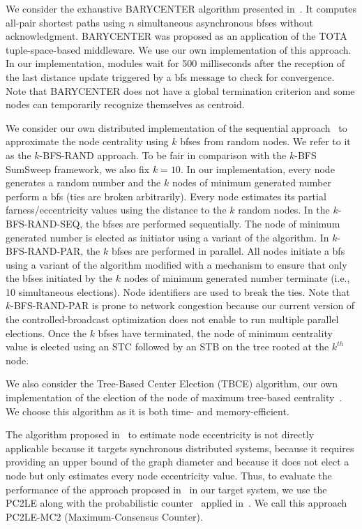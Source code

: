  We consider the exhaustive BARYCENTER algorithm presented in~\cite{mamei2005self}. It computes all-pair shortest paths using $n$ simultaneous asynchronous \gls{bfses} without acknowledgment. BARYCENTER was proposed as an application of the TOTA tuple-space-based middleware. We use our own implementation of this approach. In our implementation, modules wait for 500 milliseconds after the reception of the last distance update triggered by a \gls{bfs} message to check for convergence. Note that BARYCENTER does not have a global termination criterion and some nodes can temporarily recognize themselves as centroid. 

 We consider our own distributed implementation of the sequential approach~\cite{eppstein2001fast} to approximate the node centrality using $k$ \gls{bfses} from random nodes. We refer to it as the $k$-BFS-RAND approach. To be fair in comparison with the $k$-BFS SumSweep framework, we also fix $k = 10$. In our implementation, every node generates a random number and the $k$ nodes of minimum generated number perform a \gls{bfs} (ties are broken arbitrarily). Every node estimates its partial farness/eccentricity values using the distance to the $k$ random nodes. In the $k$-BFS-RAND-SEQ, the \gls{bfses} are performed sequentially. The node of minimum generated number is elected as initiator using a variant of the \cheungIeCb{} algorithm. In $k$-BFS-RAND-PAR, the $k$ \gls{bfses} are performed in parallel. All nodes initiate a \gls{bfs}  using a variant of the \cheungCb{} algorithm modified with a mechanism to ensure that only the \gls{bfses} initiated by the $k$ nodes of minimum generated number terminate (i.e., 10 simultaneous elections). Node identifiers are used to break the ties. Note that $k$-BFS-RAND-PAR is prone to network congestion because our current version of the controlled-broadcast optimization does not enable to run multiple parallel elections. Once the $k$ \gls{bfses} have terminated, the node of minimum centrality value is elected using an STC followed by an STB on the tree rooted at the $k^{th}$ node.

 We also consider the Tree-Based Center Election (TBCE) algorithm, our own implementation of the election of the node of maximum tree-based centrality~\cite{kim2013leader}. We choose this algorithm as it is both time- and memory-efficient.

 The algorithm proposed in~\cite{garin2012distributed} to estimate node eccentricity is not directly applicable because it targets synchronous distributed systems, because it requires providing an upper bound of the graph diameter and because it does not elect a node but only estimates every node eccentricity value. Thus, to evaluate the performance of the approach proposed in~\cite{garin2012distributed} in our target system, we use the PC2LE along with the probabilistic counter~\cite{varagnolo2010distributed} applied in~\cite{garin2012distributed}. We call this approach PC2LE-MC2 (Maximum-Consensus Counter).

